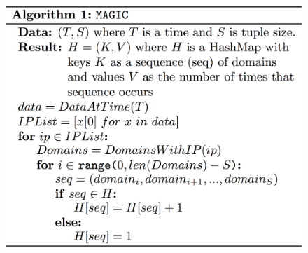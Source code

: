 \documentclass[letterpaper,twocolumn]{article}
\begin{document}
\begin{figure}[t]
\centering 
\includegraphics[width=\linewidth]{img/magic}
  \vspace{-28pt}
   \endminipage
\end{figure}
\end{document}
